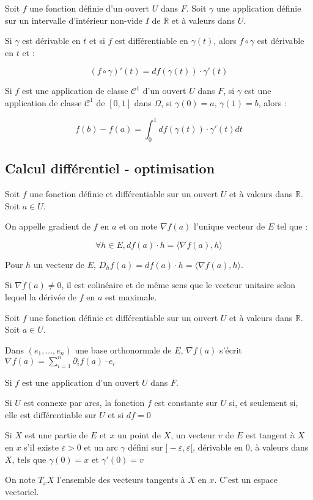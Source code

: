 \documentclass[a4paper,12pt]{book}
\newcommand{\Def}[2]{\begin{tcolorbox}[colback=white,colframe=red!10!green!20!blue!75!, title=Définition : #1]#2\end{tcolorbox}}
\newcommand{\Thr}[2]{\begin{tcolorbox}[sharp corners, colback=white,colframe=red!10!blue!30!green!75!, title=Théorème : #1]#2\end{tcolorbox}}
\def\R{\mathbb{R}}
\begin{document}
\Thr{Dérivée le long d'un arc}{Soit $f$ une fonction définie d'un ouvert $U$ dans $F$. Soit $\gamma$ une application définie sur un intervalle d'intérieur non-vide $I$ de $\R$ et à valeurs dans $U$.
\par Si $\gamma$ est dérivable en $t$ et si $f$ est différentiable en $\gamma(t)$, alors $f\circ\gamma$ est dérivable en $t$ et :
\par $$(f\circ\gamma)'(t) = df(\gamma(t))\cdot\gamma'(t)$$}
\Thr{Intégrale le long d'un arc}{Si $f$ est une application de classe $\mathcal{C}^1$ d'un ouvert $U$ dans $F$, si $\gamma$ est une application de classe $\mathcal{C}^1$ de $[0,1]$ dans $\Omega$, si $\gamma(0)=a$, $\gamma(1)=b$, alors :
\par $$f(b)-f(a) = \int_0^1df(\gamma(t))\cdot\gamma'(t)dt$$}


\subsection{Calcul différentiel - optimisation}
\Def{}{Soit $f$ une fonction définie et différentiable sur un ouvert $U$ et à valeurs dans $\R$. Soit $a\in U$.
\par On appelle gradient de $f$ en $a$ et on note $\nabla f(a)$ l'unique vecteur de $E$ tel que :
\par $$\forall h\in E, df(a)\cdot h=\langle \nabla f(a), h\rangle$$}
\Thr{Interprétation géométrique du gradient}{Pour $h$ un vecteur de $E$, $D_hf(a)= df(a)\cdot h = \langle \nabla f(a), h\rangle$.
\par Si $\nabla f(a)\neq 0$, il est colinéaire et de même sens que le vecteur unitaire selon lequel la dérivée de $f$ en $a$ est maximale.}
\Thr{Formule du gradient}{Soit $f$ une fonction définie et différentiable sur un ouvert $U$ et à valeurs dans $\R$. Soit $a\in U$.
\par Dans $(e_1,..., e_n)$ une base orthonormale de $E$, $\nabla f(a)$ s'écrit $\nabla f(a) = \sum\limits_{i=1}^n\partial_if(a)\cdot e_i$}
\Thr{Constance sur un connexe}{Si $f$ est une application d'un ouvert $U$ dans $F$.
\par Si $U$ est connexe par arcs, la fonction $f$ est constante sur $U$ si, et seulement si, elle est différentiable sur $U$ et si $df=0$}
\Def{}{Si $X$ est une partie de $E$ et $x$ un point de $X$, un vecteur $v$ de $E$ est tangent à $X$ en $x$ s'il existe $\varepsilon>0$ et un arc $\gamma$ défini sur $]-\varepsilon, \varepsilon[$, dérivable en $0$, à valeurs dans $X$, tels que $\gamma(0)=x$ et $\gamma'(0)=v$
\par On note $T_xX$ l'ensemble des vecteurs tangents à $X$ en $x$. C'est un espace vectoriel.}
\end{document}

